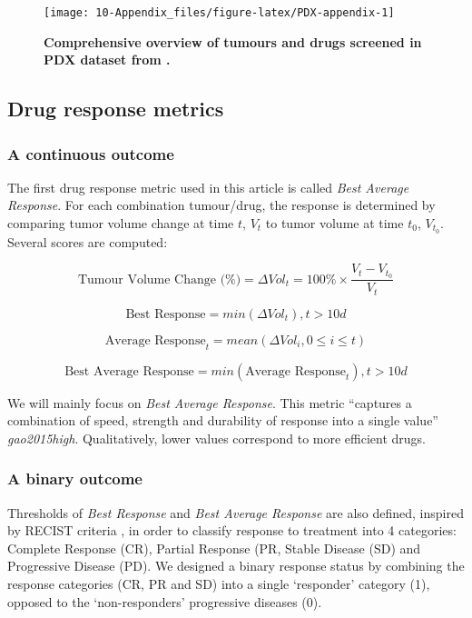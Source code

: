 \documentclass[a4paper,12pt,twoside,onecolumn,openright,final,oldfontcommands]{memoir}
\begin{document}
\begin{figure}

{\centering \texttt{[image: 10-Appendix\_files/figure-latex/PDX-appendix-1]} 

}

\caption[Comprehensive overview of tumours and drugs screened in PDX dataset from @gao2015high]{\textbf{Comprehensive overview of tumours and
drugs screened in PDX dataset from \citet{gao2015high}.}}\label{fig:PDX-appendix}
\end{figure}




\subsection{Drug response metrics}\label{drug-response-metrics}

\subsubsection{A continuous outcome}\label{a-continuous-outcome}

The first drug response metric used in this article is called \emph{Best
Average Response}. For each combination tumour/drug, the response is
determined by comparing tumor volume change at time \(t\), \(V_t\) to
tumor volume at time \(t_0\), \(V_{t_0}\). Several scores are computed:

\[\text{Tumour Volume Change (\%)} = \Delta Vol_t = 100\% \times \dfrac{V_t-V_{t_0}}{V_t}\]

\[\text{Best Response} = min(\Delta Vol_t), t>10d\]

\[\text{Average Response}_t = mean(\Delta Vol_i, 0 \leq i\leq t)\]

\[\text{Best Average Response} = min(\text{Average Response}_t), t>10d\]

We will mainly focus on \emph{Best Average Response}. This metric
``captures a combination of speed, strength and durability of response
into a single value'' \emph{gao2015high}. Qualitatively, lower values
correspond to more efficient drugs.

\subsubsection{A binary outcome}\label{a-binary-outcome}

Thresholds of \emph{Best Response} and \emph{Best Average Response} are
also defined, inspired by RECIST criteria \citep{therasse2000new}, in
order to classify response to treatment into 4 categories: Complete
Response (CR), Partial Response (PR, Stable Disease (SD) and Progressive
Disease (PD). We designed a binary response status by combining the
response categories (CR, PR and SD) into a single `responder' category
(1), opposed to the `non-responders' progressive diseases (0).
\end{document}
